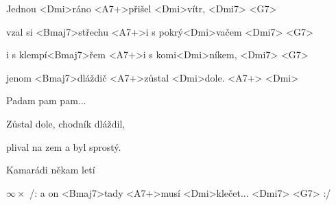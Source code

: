 

\zs
Jednou <Dmi>ráno <A7+>přišel <Dmi>vítr, <Dmi7> <G7>

vzal si <Bmaj7>střechu <A7+>i s pokrý<Dmi>vačem <Dmi7> <G7>

i s klempí<Bmaj7>řem <A7+>i s komi<Dmi>níkem, <Dmi7> <G7>

jenom <Bmaj7>dláždič <A7+>zůstal <Dmi>dole. <A7+> <Dmi>
\ks

\zs
Padam pam pam...
\ks

\zs
Zůstal dole, chodník dláždil,

plival na zem a byl sprostý.

Kamarádi někam letí

$\infty\times$ /: a on <Bmaj7>tady <A7+>musí <Dmi>klečet... 
<Dmi7> <G7> :/
\ks

\kp
